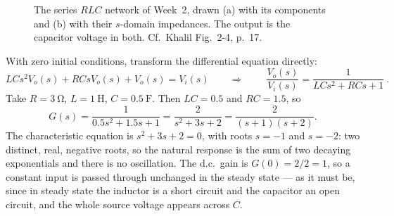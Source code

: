 \documentclass[11pt,a4paper]{article}
\begin{document}
\begin{figure}[htbp]
\centering
{}
\caption{The series $RLC$ network of Week~2, drawn (a) with its components and
(b) with their $s$-domain impedances. The output is the capacitor voltage in
both. Cf.\ Khalil Fig.~2-4, p.~17.}
\label{fig:rlc}
\end{figure}

\begin{workedex}[breakable, title=Worked example 3.2 --- transfer function of the series $RLC$ network]
With zero initial conditions, transform the differential equation directly:
\[
  LCs^{2}V_o(s) + RCsV_o(s) + V_o(s) = V_i(s)
  \qquad\Longrightarrow\qquad
  \boxed{\ \frac{V_o(s)}{V_i(s)} = \frac{1}{LCs^{2}+RCs+1}\ } .
\]
Take $R=\SI{3}{\ohm}$, $L=\SI{1}{\henry}$, $C=\SI{0.5}{\farad}$. Then
$LC=0.5$ and $RC=1.5$, so
\[
  G(s) = \frac{1}{0.5s^{2}+1.5s+1}
       = \frac{2}{s^{2}+3s+2}
       = \frac{2}{(s+1)(s+2)} .
\]
The characteristic equation is $s^{2}+3s+2=0$, with roots $s=-1$ and $s=-2$:
two distinct, real, negative roots, so the natural response is the sum of two
decaying exponentials and there is no oscillation. The d.c.\ gain is
$G(0)=2/2=1$, so a constant input is passed through unchanged in the steady
state --- as it must be, since in steady state the inductor is a short circuit
and the capacitor an open circuit, and the whole source voltage appears across
$C$.
\end{workedex}
\end{document}
